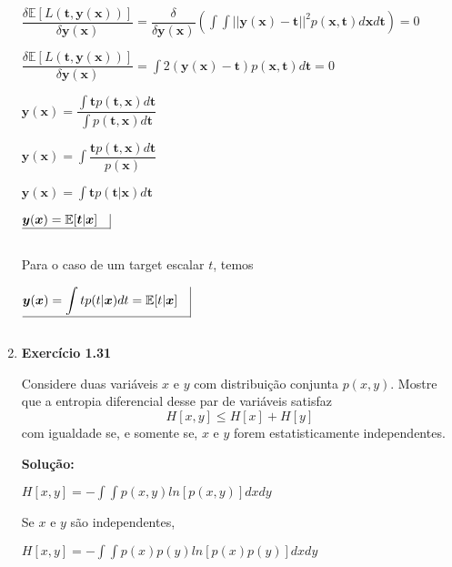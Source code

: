 \begin{enumerate}
$\dfrac{\delta \mathbb{E}[L(\boldsymbol{t},\boldsymbol{y}(\boldsymbol{x}))]}{\delta \boldsymbol{y}(\boldsymbol{x})} = \dfrac{\delta}{\delta \boldsymbol{y}(\boldsymbol{x})} \left( \displaystyle \int \int ||\boldsymbol{y}(\boldsymbol{x})-\boldsymbol{t}||^2p(\boldsymbol{x},\boldsymbol{t})d\boldsymbol{x}d\boldsymbol{t} \right) = 0$

$\dfrac{\delta \mathbb{E}[L(\boldsymbol{t},\boldsymbol{y}(\boldsymbol{x}))]}{\delta \boldsymbol{y}(\boldsymbol{x})} = \displaystyle  \int 2(\boldsymbol{y}(\boldsymbol{x})-\boldsymbol{t}) p(\boldsymbol{x},\boldsymbol{t}) d\boldsymbol{t} = 0$

$\boldsymbol{y}(\boldsymbol{x}) = \displaystyle \dfrac{\int \boldsymbol{t} p(\boldsymbol{t},\boldsymbol{x}) d\boldsymbol{t}}{\int p(\boldsymbol{t},\boldsymbol{x}) d\boldsymbol{t}} $

$\boldsymbol{y}(\boldsymbol{x}) = \displaystyle \int \dfrac{\boldsymbol{t} p(\boldsymbol{t},\boldsymbol{x}) d\boldsymbol{t}}{p(\boldsymbol{x})} $

$\boldsymbol{y}(\boldsymbol{x}) = \displaystyle \int \boldsymbol{t} p(\boldsymbol{t}|\boldsymbol{x}) d\boldsymbol{t} $

$\underline{\boldsymbol{y}(\boldsymbol{x}) = \mathbb{E}[\boldsymbol{t}|\boldsymbol{x}] \quad} \vline $

$ $

Para o caso de um target escalar $t$, temos

$\underline{\boldsymbol{y}(\boldsymbol{x}) = \displaystyle \int t p(t|\boldsymbol{x}) dt = \mathbb{E}[t|\boldsymbol{x}] \quad} \vline $

$ $

\item \textbf{Exercício 1.31} \par

Considere duas variáveis $x$ e $y$ com distribuição conjunta $p(x, y)$. Mostre que a entropia diferencial desse par de variáveis satisfaz
\begin{equation*}
    H[x,y] \leq H[x] + H[y]
\end{equation*}
com igualdade se, e somente se, $x$ e $y$ forem estatisticamente independentes.
\newline \par
\textbf{Solução:}

$H[x,y] = \displaystyle - \int \int p(x,y) ln[ p(x,y)] dx dy$

Se $x$ e $y$ são independentes,

$H[x,y] = \displaystyle - \int \int p(x)p(y) ln[ p(x)p(y)] dx dy$


\end{enumerate}
